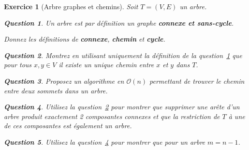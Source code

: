 \documentclass{article}
\theoremstyle{exostyle}
\newtheorem{exo}{Exercice}
\theoremstyle{partiestyle}
\theoremstyle{questionstyle}
\newtheorem{question}{Question}[exo]
\begin{document}
\begin{exo}[Arbre graphes et chemins]
		Soit $T = (V, E)$ un arbre.
		\begin{question}
			\label{définition-arbre}
			Un arbre est par définition un graphe {\bf \em connexe et sans-cycle}. 
			
			Donnez les définitions de {\bf connexe}, {\bf chemin} et {\bf cycle}.
		\end{question}
		
		\begin{question}
			\label{unique-chemin}
			Montrez en utilisant uniquement la définition de la question~\ref{définition-arbre} que pour tous $x, y \in V$ il existe un unique chemin entre $x$ et $y$ dans $T$.
		\end{question}
		\begin{question}
			Proposez un algorithme en $\mathcal{O}(n)$ permettant de trouver le chemin entre deux sommets dans un arbre.
		\end{question}

		\begin{question}
			\label{composantes}
			Utilisez la question~\ref{unique-chemin} pour montrer que supprimer une arête d'un arbre produit exactement 2 composantes connexes et que la restriction de $T$ à une de ces composantes est également un arbre.
		\end{question}			
		\begin{question}
			Utilisez la question~\ref{composantes} pour montrer que pour un arbre $m=n-1$.

		\end{question}

\end{exo}
\end{document}
